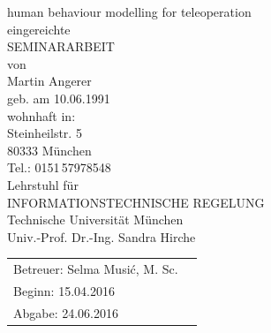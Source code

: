 \documentclass[a4paper,twoside, openright,12pt]{report}
\begin{document}
\pagestyle{empty}
\enlargethispage{4.5cm} %
\begin{center}
\phantom{u}
\vspace{0.5cm}
\Huge{\sc human behaviour modelling for teleoperation}\\
\vspace{1.5cm}
                                 \large{eingereichte\\
			  SEMINARARBEIT\\%
                                           von\\

						\vspace{0.4cm}
					Martin Angerer\\
						\vspace{0.5cm}
					geb. am 10.06.1991\\
					wohnhaft in:\\
					Steinheilstr. 5\\
					80333 M\"unchen\\
					Tel.: 0151\,57978548\\
					\vspace{1.5cm}
					Lehrstuhl f\"ur\\
					INFORMATIONSTECHNISCHE REGELUNG \\
					Technische Universit\"at M\"unchen\\
					\vspace{0.6cm}
                    Univ.-Prof. Dr.-Ing. Sandra Hirche}
\end{center}
\vspace{5.0cm}
\begin{tabular}{ll}
Betreuer: Selma Musi\'c, M. Sc.  \\
Beginn: \hspace{10.5ex} 15.04.2016  \\
Abgabe: \hspace{9.8ex} 24.06.2016 \\
\end{tabular}

\newpage
\cleardoublepage
\end{document}
